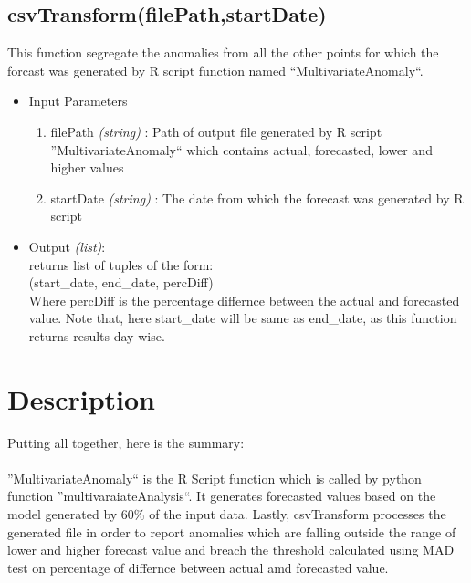\subsection{csvTransform(filePath,startDate)}

This function segregate the anomalies from all the other points for which the forcast was 
generated by R script function named ``MultivariateAnomaly``.

\begin{itemize}
 \item Input Parameters
 
 \begin{enumerate}
  \item filePath \textit{(string)} : Path of output file generated by R script ''MultivariateAnomaly`` which contains actual, forecasted, lower and higher values  
  \item startDate \textit{(string)} : The date from which the forecast was generated by R script
 \end{enumerate}

 \item Output \textit{(list)}: \\
  returns list of tuples of the form: \\
  (start\_date, end\_date, percDiff) \\
  Where percDiff is the percentage differnce between the actual and forecasted value.
  Note that, here start\_date will be same as end\_date, as this function 
returns results day-wise.
 

\end{itemize}


\section{Description}

Putting all together, here is the summary:\\
\\
''MultivariateAnomaly`` is the R Script function which is called by  python function ''multivaraiateAnalysis``.
It generates forecasted values based on the model generated by 60\% of the input data.
Lastly, csvTransform processes the generated file in order to report anomalies which are falling outside the range of lower
and higher forecast value and breach the threshold calculated using MAD test on percentage of differnce between actual amd 
forecasted value.